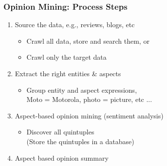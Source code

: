 \documentclass[t]{beamer}
\begin{document}
\begin{frame} \frametitle{Opinion Mining: Process Steps} %

\begin{enumerate}

\item Source the data, e.g., reviews, blogs, etc
   \begin{itemize}
      \item Crawl all data, store and search them, or 
      \item Crawl only the target data
   \end{itemize}

\item Extract the right entities \& aspects
\begin{itemize}
\item Group entity and aspect expressions, \\  Moto = Motorola, photo = picture, etc ...

\end{itemize}

\item Aspect-based opinion mining (sentiment analysis)
\begin{itemize}
\item Discover all quintuples \\
(Store the quintuples in a database)
\end{itemize}

\item Aspect based opinion summary

\end{enumerate}


\end{frame} 
\end{document}
